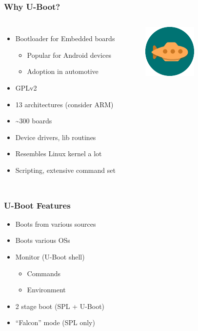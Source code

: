 \begin{frame}
  \frametitle{Why U-Boot?}
  \begin{columns}
      \begin{itemize}
      \item Bootloader for Embedded boards
        \begin{itemize}
        \item Popular for Android devices
        \item Adoption in automotive
        \end{itemize}
      \item GPLv2
      \item 13 architectures (consider ARM)
      \item \textasciitilde 300 boards
      \item Device drivers, lib routines
      \item Resembles Linux kernel a lot
      \item Scripting, extensive command set
      \end{itemize}
      \begin{figure}[ht]
      \begin{center}
        \includegraphics[scale=2]{images/uboot-logo.pdf}
      \end{center}
      \end{figure}
  \end{columns}
\end{frame}

\begin{frame}
  \frametitle{U-Boot Features}
  \begin{itemize}
  \item Boots from various sources
  \item Boots various OSs
  \item Monitor (U-Boot shell)
    \begin{itemize}
    \item Commands
    \item Environment
    \end{itemize}
  \item 2 stage boot (SPL + U-Boot)
  \item ``Falcon'' mode (SPL only)
  \end{itemize}
\end{frame}

